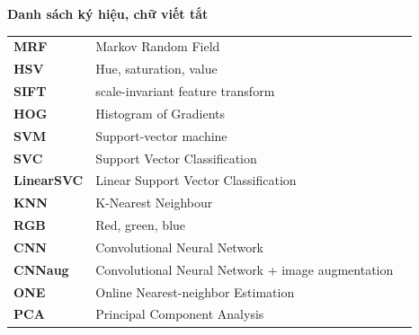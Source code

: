 \documentclass[12pt]{report}
\begin{document}
		\newpage
		\begin{flushleft}
			\bfseries{\Huge{Danh sách ký hiệu, chữ viết tắt}}
		\end{flushleft}
		\begin{table}[h]
			\centering
			\begin{tabular}{lll}
				\textbf{MRF}       & Markov Random Field                               \\[0.3cm]
				\textbf{HSV}       & Hue, saturation, value                            \\[0.3cm]
				\textbf{SIFT}      & scale-invariant feature transform                 \\[0.3cm]
				\textbf{HOG}       & Histogram of Gradients                            \\[0.3cm]
				\textbf{SVM}       & Support-vector machine                            \\[0.3cm]
				\textbf{SVC}       & Support Vector Classification                     \\[0.3cm]
				\textbf{LinearSVC} & Linear Support Vector Classification              \\[0.3cm]
				\textbf{KNN}       & K-Nearest Neighbour                               \\[0.3cm]
				\textbf{RGB}       & Red, green, blue                                  \\[0.3cm]
				\textbf{CNN}       & Convolutional Neural Network                      \\[0.3cm]
				\textbf{CNNaug}    & Convolutional Neural Network + image augmentation \\[0.3cm]
				\textbf{ONE}       & Online Nearest-neighbor Estimation                \\[0.3cm]
				\textbf{PCA}       & Principal Component Analysis                      \\[0.3cm]
																																																																																																																																																						
			\end{tabular}
		\end{table}
																																																																										
		\newpage
		\listoffigures
																																																																										
\end{document}

